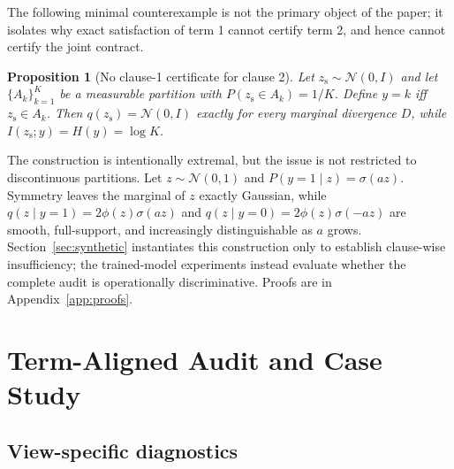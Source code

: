 \documentclass{article}
\newtheorem{proposition}{Proposition}
\newcommand{\zs}{z_{\mathrm{s}}}
\begin{document}
The following minimal counterexample is not the primary object of the paper;
it isolates why exact satisfaction of term 1 cannot certify term 2, and hence
cannot certify the joint contract.

\begin{proposition}[No clause-1 certificate for clause 2]
\label{prop:nocert}
Let $\zs\sim\mathcal N(0,I)$ and let $\{A_k\}_{k=1}^K$ be a measurable
partition with $P(\zs\in A_k)=1/K$.  Define $y=k$ iff $\zs\in A_k$.  Then
$q(\zs)=\mathcal N(0,I)$ exactly for every marginal divergence $D$, while
$I(\zs;y)=H(y)=\log K$.
\end{proposition}

The construction is intentionally extremal, but the issue is not restricted
to discontinuous partitions.  Let $z\sim\mathcal N(0,1)$ and
$P(y=1\mid z)=\sigma(az)$.  Symmetry leaves the marginal of $z$ exactly
Gaussian, while $q(z\mid y=1)=2\phi(z)\sigma(az)$ and
$q(z\mid y=0)=2\phi(z)\sigma(-az)$ are smooth, full-support, and increasingly
distinguishable as $a$ grows.  Section~\ref{sec:synthetic} instantiates this
construction only to establish clause-wise insufficiency; the trained-model
experiments instead evaluate whether the complete audit is operationally
discriminative.  Proofs are in Appendix~\ref{app:proofs}.

\section{Term-Aligned Audit and Case Study}
\label{sec:protocol}

\subsection{View-specific diagnostics}
\end{document}
